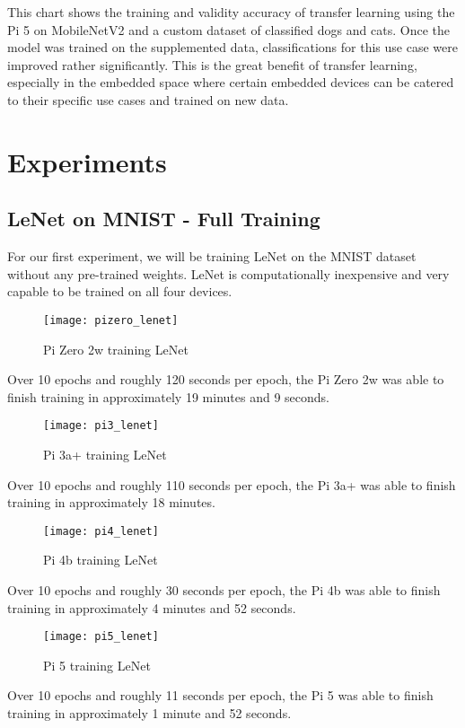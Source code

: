 \documentclass{article}
\begin{document}
\begin{multicols}{2}
This chart shows the training and validity accuracy of transfer learning using the Pi 5 on MobileNetV2 and a custom dataset of classified dogs and cats. Once the model was trained on the supplemented data, classifications for this use case were improved rather significantly. This is the great benefit of transfer learning, especially in the embedded space where certain embedded devices can be catered to their specific use cases and trained on new data.

\section{Experiments}
\subsection{LeNet on MNIST - Full Training}
For our first experiment, we will be training LeNet on the MNIST dataset without any pre-trained weights. LeNet is computationally inexpensive and very capable to be trained on all four devices. 

\begin{figure}[H]
\texttt{[image: pizero\_lenet]}
\centering
\caption{Pi Zero 2w training LeNet}
\label{fig:pizero_lenet}
\end{figure}
Over 10 epochs and roughly 120 seconds per epoch, the Pi Zero 2w was able to finish training in approximately 19 minutes and 9 seconds. 

\begin{figure}[H]
\texttt{[image: pi3\_lenet]}
\centering
\caption{Pi 3a+ training LeNet}
\label{fig:pi3_lenet}
\end{figure}
Over 10 epochs and roughly 110 seconds per epoch, the Pi 3a+ was able to finish training in approximately 18 minutes. 

\begin{figure}[H]
\texttt{[image: pi4\_lenet]}
\centering
\caption{Pi 4b training LeNet}
\label{fig:pi4_lenett}
\end{figure}
Over 10 epochs and roughly 30 seconds per epoch, the Pi 4b was able to finish training in approximately 4 minutes and 52 seconds. 

\begin{figure}[H]
\texttt{[image: pi5\_lenet]}
\centering
\caption{Pi 5 training LeNet}
\label{fig:pi5_lenet}
\end{figure}
Over 10 epochs and roughly 11 seconds per epoch, the Pi 5 was able to finish training in approximately 1 minute and 52 seconds. 


\end{multicols}
\end{document}
